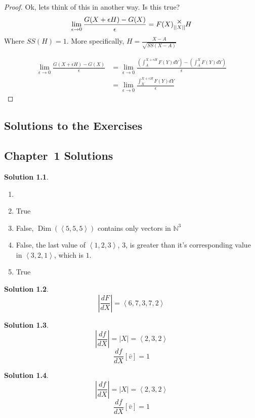 \documentclass[12pt]{book}
\theoremstyle{plain}
\theoremstyle{definition}
\theoremstyle{ppart}
\theoremstyle{case}
\newcounter{solutionctr}
\theoremstyle{solution}
\newtheorem{solution}{Solution}
\newcommand{\solutionsection}[1]{
  \section{Chapter~#1 Solutions}\setcounter{solutionctr}{0}}
\DeclareMathOperator{\Dim}{Dim}
\newcommand{\mmult}[1]{\text{\raisebox{1ex}{$\underset{#1}{\times}$}}}
\begin{document}
\begin{landscape}
\begin{proof}
Ok, lets think of this in another way. Is this true?
\[
	\lim_{\epsilon \to 0}
	\frac{
		G(X+\epsilon H) - G(X)
	}{\epsilon}
	=
	F(X) \mmult{||X||} H
\]
Where $SS(H) = 1$. More specifically, $H = \frac{X-A}{\sqrt{SS(X-A)}}$

\begin{align*}
\lim_{\epsilon \to 0}
\frac{
	G(X+\epsilon H) - G(X)
}{\epsilon}
&= 
\lim_{\epsilon \to 0}
\frac{
	\left( \int_A^{X+\epsilon H} F(Y) dY \right) - \left( \int_A^X F(Y) dY \right)
}{\epsilon} \\
&= 
\lim_{\epsilon \to 0}
\frac{
	\int_X^{X+\epsilon H} F(Y) dY
}{\epsilon}
\end{align*}
\end{proof}
\end{landscape}

\begin{appendices}

\chapter{Solutions to the Exercises}

\solutionsection{1}

\begin{solution}
\begin{enumerate}
\item[]
\item True
\item False, $\Dim(\left<5,5,5\right>)$ contains only vectors in $\mathbb{N}^3$ 
\item False, the last value of $\left<1,2,3\right>$, $3$, is greater than it's
						 corresponding value in $\left<3,2,1\right>$, which is $1$.
\item True
\end{enumerate}
\end{solution}

\begin{solution}
\[ \left|\frac{dF}{dX}\right| = \left<6,7,3,7,2\right> \]
\end{solution}

\begin{solution}
\[ \left|\frac{df}{dX}\right| = |X| = \left<2,3,2\right> \]
\[ \frac{df}{dX}[\bar{v}] = 1 \]
\end{solution}

\begin{solution}
\[ \left|\frac{df}{dX}\right| = |X| = \left<2,3,2\right> \]
\[ \frac{df}{dX}[\bar{v}] = 1 \]
\end{solution}


\end{appendices}
\end{document}
